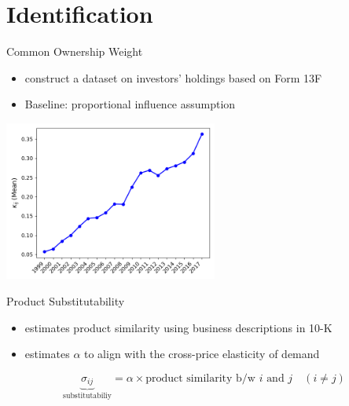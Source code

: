 \documentclass[
  aspectratio=169,  %
  handout           %
]{beamer}
\theoremstyle{plain}
\begin{document}
\section{Identification}

\begin{frame}{Common Ownership Weight}
  \begin{itemize}
    \item \citet{Backus2021-yt} construct a dataset on investors' holdings
          based on Form 13F
    \item Baseline: \cite{Rotemberg1984-jz} proportional influence assumption \hfill\hyperlink{rotemberg}{}
  \end{itemize}
  \begin{center}
    \includegraphics[width=7cm]{figures/kappa}
  \end{center}
\end{frame}
%
\begin{frame}{Product Substitutability}

  \begin{itemize}
    \item \citet{Hoberg2016-jm} estimates product similarity using business
          descriptions in 10-K
          \medskip{}
    \item \citet{Pellegrino2024-dn} estimates $\alpha$ to align with the cross-price
          elasticity of demand
  \end{itemize}
  \medskip{}
  \[
    \underbrace{\sigma_{ij}}_{\text{substitutabiliy}}=\alpha\times\text{product similarity b/w }i\text{ and }j\quad\left(i\neq j\right)
  \]

\end{frame}
%
\end{document}
